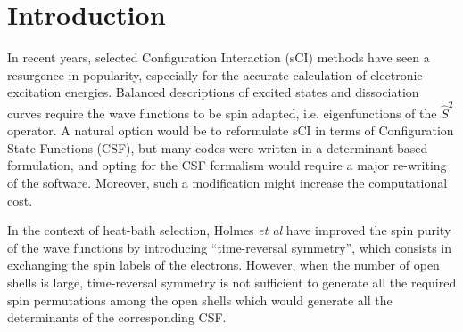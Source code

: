 \documentclass[aip,jcp,reprint,showkeys]{revtex4-1}
\newcommand{\stwo}{\hat{S}^2}
\newcommand{\csf}{CSF}
\newcommand{\sci}{sCI}
\begin{document}
\section{Introduction}

In recent years, selected Configuration Interaction (\sci) methods have seen a resurgence in
popularity,\cite{Greer_1998,Stampfuss_2005,Bytautas_2009,Booth_2009,Giner_2013,Buenker_2014,Holmes_2016,Ohtsuka_2017,Coe_2018}
especially for the accurate calculation of electronic excitation
energies.\cite{Coe_2013,Schriber_2017,Holmes_2017,Loos_2018,Scemama_2018,Dash_2018,Chien_2018,Loos_2018a}
Balanced descriptions of excited states and dissociation curves require
the wave functions to be spin adapted, i.e. eigenfunctions of the $\stwo$
operator. A natural option would be to reformulate \sci{} in terms of
Configuration State Functions (\csf), but many codes were written in a
determinant-based formulation, and opting for the {\csf} formalism would require
a major re-writing of the software. Moreover, such a modification might
increase the computational cost.\cite{Knowles_1984,Olsen_1988}

In the context of heat-bath selection, Holmes \textit{et al} have 
improved the spin purity of the wave functions by introducing ``time-reversal
symmetry'', \cite{Holmes_2017} which consists in exchanging the spin labels of
the electrons.
However, when the number of open shells is large, time-reversal symmetry is not
sufficient to generate all the required spin permutations among the open shells
which would generate all the determinants of the corresponding \csf.
\end{document}
